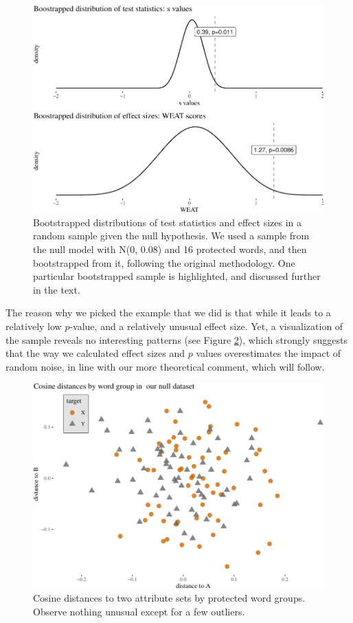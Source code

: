 \documentclass{clv3}
\begin{document}
\begin{figure}
	
	\begin{center}\includegraphics[width=0.8\linewidth]{figures/figcaliskanCalcB2D} \end{center}
	
	\caption{Bootstrapped distributions of test statistics and effect sizes in a random sample given the null hypothesis. We used a sample from the null  model with N($0$, $0.08$) and 16 protected words, and then bootstrapped from it, following the original methodology. One particular bootstrapped sample is highlighted, and discussed further in the text. }
	\label{fig:caliskanCalc}
\end{figure}




The reason why we picked the example that we did is that  while it leads to a relatively low \(p\)-value, and a relatively unusual effect size. Yet, a visualization of the sample reveals no interesting patterns (see Figure \ref{fig:caliskanDistances}), which strongly suggests that the way we calculated effect sizes and \(p\) values overestimates the impact of random noise, in line with our more theoretical comment, which will follow. 



\begin{figure}

\begin{center}\includegraphics[width=0.8\linewidth]{figures/figcaliskanDistC2K} \end{center}

\caption{Cosine distances to two attribute sets by protected word groups. Observe nothing unusual except for a few outliers.}
\label{fig:caliskanDistances}
\end{figure}
\end{document}
